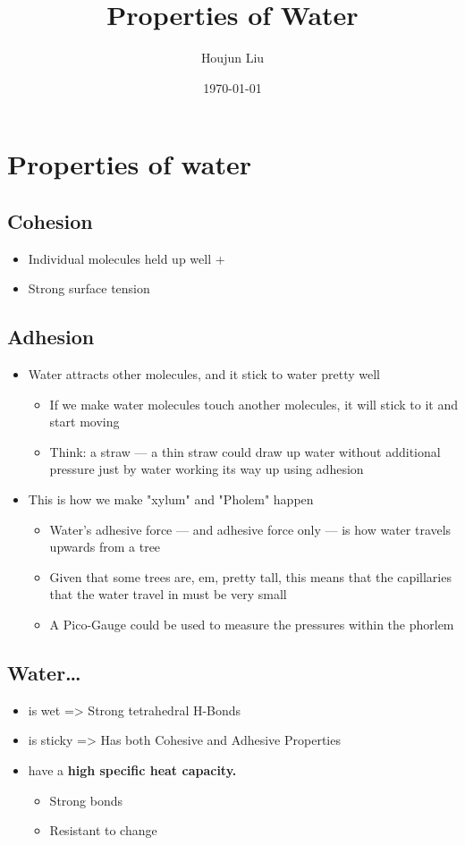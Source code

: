 \documentclass[letterpaper]{article}
\author{Houjun Liu}
\date{\today}
\title{Properties of Water}
\renewcommand{\tableofcontents}{}
\begin{document}
\tableofcontents



\section{Properties of water}
\label{sec:orga6f18fc}
\subsection{Cohesion}
\label{sec:org59812a1}
\begin{itemize}
\item Individual molecules held up well +
\item Strong surface tension
\end{itemize}

\subsection{Adhesion}
\label{sec:org6bfb132}
\begin{itemize}
\item Water attracts other molecules, and it stick to water pretty well

\begin{itemize}
\item If we make water molecules touch another molecules, it will stick to
it and start moving
\item Think: a straw --- a thin straw could draw up water without
additional pressure just by water working its way up using adhesion
\end{itemize}

\item This is how we make "xylum" and "Pholem" happen

\begin{itemize}
\item Water's adhesive force --- and adhesive force only --- is how water
travels upwards from a tree
\item Given that some trees are, em, pretty tall, this means that the
capillaries that the water travel in must be very small
\item A Pico-Gauge could be used to measure the pressures within the
phorlem
\end{itemize}
\end{itemize}

\subsection{Water\ldots{}}
\label{sec:org1812cbe}
\begin{itemize}
\item is wet => Strong tetrahedral H-Bonds
\item is sticky => Has both Cohesive and Adhesive Properties
\item have a \textbf{high specific heat capacity.}

\begin{itemize}
\item Strong bonds
\item Resistant to change
\end{itemize}
\end{itemize}
\end{document}
